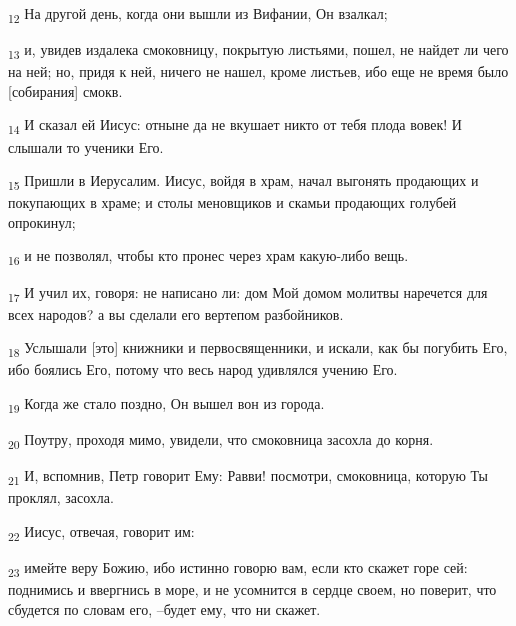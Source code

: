 \begin{tcolorbox}
\textsubscript{12} На другой день, когда они вышли из Вифании, Он взалкал;
\end{tcolorbox}
\begin{tcolorbox}
\textsubscript{13} и, увидев издалека смоковницу, покрытую листьями, пошел, не найдет ли чего на ней; но, придя к ней, ничего не нашел, кроме листьев, ибо еще не время было [собирания] смокв.
\end{tcolorbox}
\begin{tcolorbox}
\textsubscript{14} И сказал ей Иисус: отныне да не вкушает никто от тебя плода вовек! И слышали то ученики Его.
\end{tcolorbox}
\begin{tcolorbox}
\textsubscript{15} Пришли в Иерусалим. Иисус, войдя в храм, начал выгонять продающих и покупающих в храме; и столы меновщиков и скамьи продающих голубей опрокинул;
\end{tcolorbox}
\begin{tcolorbox}
\textsubscript{16} и не позволял, чтобы кто пронес через храм какую-либо вещь.
\end{tcolorbox}
\begin{tcolorbox}
\textsubscript{17} И учил их, говоря: не написано ли: дом Мой домом молитвы наречется для всех народов? а вы сделали его вертепом разбойников.
\end{tcolorbox}
\begin{tcolorbox}
\textsubscript{18} Услышали [это] книжники и первосвященники, и искали, как бы погубить Его, ибо боялись Его, потому что весь народ удивлялся учению Его.
\end{tcolorbox}
\begin{tcolorbox}
\textsubscript{19} Когда же стало поздно, Он вышел вон из города.
\end{tcolorbox}
\begin{tcolorbox}
\textsubscript{20} Поутру, проходя мимо, увидели, что смоковница засохла до корня.
\end{tcolorbox}
\begin{tcolorbox}
\textsubscript{21} И, вспомнив, Петр говорит Ему: Равви! посмотри, смоковница, которую Ты проклял, засохла.
\end{tcolorbox}
\begin{tcolorbox}
\textsubscript{22} Иисус, отвечая, говорит им:
\end{tcolorbox}
\begin{tcolorbox}
\textsubscript{23} имейте веру Божию, ибо истинно говорю вам, если кто скажет горе сей: поднимись и ввергнись в море, и не усомнится в сердце своем, но поверит, что сбудется по словам его, --будет ему, что ни скажет.
\end{tcolorbox}

